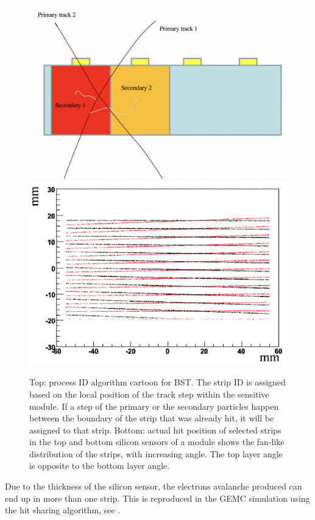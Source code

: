 \begin{figure}
	\centering
	\includegraphics[width=0.95\columnwidth,keepaspectratio]{img/bstHit.png}
	\includegraphics[width=0.95\columnwidth,keepaspectratio]{img/bstStrip.png}
	\caption{Top: process ID algorithm cartoon for BST. The strip ID is assigned based on the local position of the track
            step within the sensitive module. If a step of the primary or the secondary particles happen between the boundary
            of the strip that was already hit, it will be assigned to that strip. Bottom: actual hit position of selected
            strips in the top and bottom silicon sensors of a module shows the fan-like distribution of the strips,
            with increasing angle. The top layer angle is opposite to the bottom layer angle. }
	\label{fig:processID}
\end{figure}

Due to the thickness of the silicon sensor, the electrons avalanche produced can end up in more than one strip. This
is reproduced in the GEMC simulation using the hit sharing algorithm, see .

